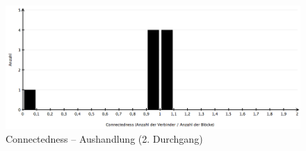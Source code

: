 \begin{figure}[htbp]
	\centering
		\includegraphics[width=12cm]{img/Evaluierung/connectednessAushandlung2.png}
	\caption{Connectedness -- Aushandlung (2. Durchgang)}
	\label{fig:img_Evaluierung_connectednessAushandlung2}
\end{figure}


